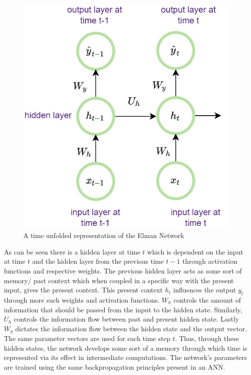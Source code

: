 \documentclass{article}
\begin{document}
\begin{figure}[H]
\centering
\includegraphics[scale=0.4]{theory/rnn.png}
\caption{A time unfolded representation of the Elman Network}
\label{fig:rnn}
\end{figure}
As can be seen there is a hidden layer at time $t$ which is dependent on the input at time $t$ and the hidden layer from the previous time $t-1$ through activation functions and respective weights. The previous hidden layer acts as some sort of memory/ past context which when coupled in a specific way with the present input, gives the present context. This present context $h_t$ influences the output $y_t$ through more such weights and activation functions. $W_h$ controls the amount of information that should be passed from the input to the hidden state. Similarly, $U_h$ controls the information flow between past and present hidden state. Lastly $W_y$ dictates the information flow between the hidden state and the output vector. The same parameter vectors are used for each time step $t$. Thus, through these hidden states, the network develops some sort of a memory through which time is represented via its effect in intermediate computations. The network's parameters are trained using the same backpropagation principles present in an ANN. 
\end{document}
